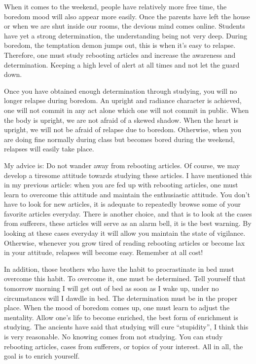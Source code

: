 \documentclass[
]{book}
\begin{document}
When it comes to the weekend, people have relatively more free time, the boredom mood will also appear more easily. Once the parents have left the house or when we are shut inside our rooms, the devious mind comes online. Students have yet a strong determination, the understanding being not very deep. During boredom, the temptation demon jumps out, this is when it's easy to relapse. Therefore, one must study rebooting articles and increase the awareness and determination. Keeping a high level of alert at all times and not let the guard down.

Once you have obtained enough determination through studying, you will no longer relapse during boredom. An upright and radiance character is achieved, one will not commit in any act alone which one will not commit in public. When the body is upright, we are not afraid of a skewed shadow. When the heart is upright, we will not be afraid of relapse due to boredom. Otherwise, when you are doing fine normally during class but becomes bored during the weekend, relapses will easily take place.

My advice is: Do not wander away from rebooting articles. Of course, we may develop a tiresome attitude towards studying these articles. I have mentioned this in my previous article: when you are fed up with rebooting articles, one must learn to overcome this attitude and maintain the enthusiastic attitude. You don't have to look for new articles, it is adequate to repeatedly browse some of your favorite articles everyday. There is another choice, and that is to look at the cases from sufferers, these articles will serve as an alarm bell, it is the best warning. By looking at these cases everyday it will allow you maintain the state of vigilance. Otherwise, whenever you grow tired of reading rebooting articles or become lax in your attitude, relapses will become easy. Remember at all cost!

In addition, those brothers who have the habit to procrastinate in bed must overcome this habit. To overcome it, one must be determined. Tell yourself that tomorrow morning I will get out of bed as soon as I wake up, under no circumstances will I dawdle in bed. The determination must be in the proper place. When the mood of boredom comes up, one must learn to adjust the mentality. Allow one's life to become enriched, the best form of enrichment is studying. The ancients have said that studying will cure ``stupidity'', I think this is very reasonable. No knowing comes from not studying. You can study rebooting articles, cases from sufferers, or topics of your interest. All in all, the goal is to enrich yourself.
\end{document}
